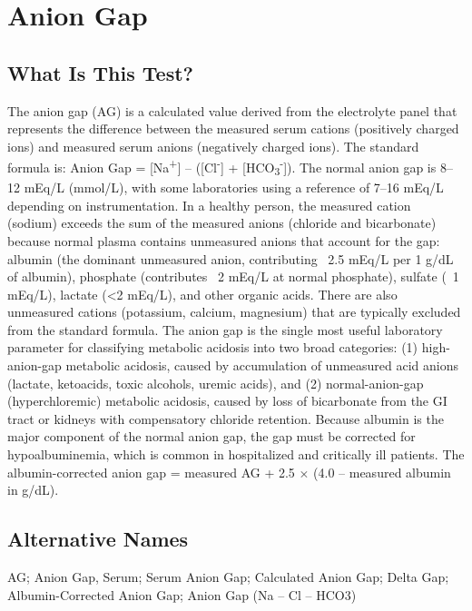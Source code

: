 \chapter{Anion Gap}

\section*{What Is This Test?}
The anion gap (AG) is a calculated value derived from the electrolyte panel that represents the difference between the measured serum cations (positively charged ions) and measured serum anions (negatively charged ions). The standard formula is: Anion Gap = [Na\textsuperscript{+}] -- ([Cl\textsuperscript{-}] + [HCO\textsubscript{3}\textsuperscript{-}]). The normal anion gap is 8--12 mEq/L (mmol/L), with some laboratories using a reference of 7--16 mEq/L depending on instrumentation. In a healthy person, the measured cation (sodium) exceeds the sum of the measured anions (chloride and bicarbonate) because normal plasma contains unmeasured anions that account for the gap: albumin (the dominant unmeasured anion, contributing ~2.5 mEq/L per 1 g/dL of albumin), phosphate (contributes ~2 mEq/L at normal phosphate), sulfate (~1 mEq/L), lactate (<2 mEq/L), and other organic acids. There are also unmeasured cations (potassium, calcium, magnesium) that are typically excluded from the standard formula. The anion gap is the single most useful laboratory parameter for classifying metabolic acidosis into two broad categories: (1) high-anion-gap metabolic acidosis, caused by accumulation of unmeasured acid anions (lactate, ketoacids, toxic alcohols, uremic acids), and (2) normal-anion-gap (hyperchloremic) metabolic acidosis, caused by loss of bicarbonate from the GI tract or kidneys with compensatory chloride retention. Because albumin is the major component of the normal anion gap, the gap must be corrected for hypoalbuminemia, which is common in hospitalized and critically ill patients. The albumin-corrected anion gap = measured AG + 2.5 $\times$ (4.0 -- measured albumin in g/dL).

\section*{Alternative Names}
AG; Anion Gap, Serum; Serum Anion Gap; Calculated Anion Gap; Delta Gap; Albumin-Corrected Anion Gap; Anion Gap (Na -- Cl -- HCO3)

